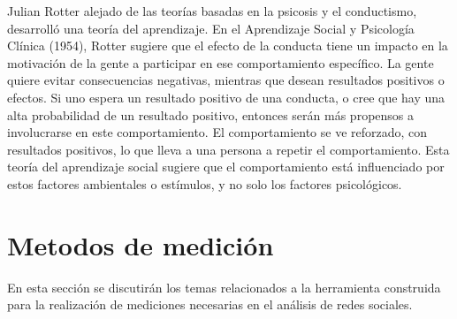 Julian Rotter alejado de las teor\'ias basadas en la psicosis y el conductismo, desarroll\'o una teor\'ia del aprendizaje.
En el Aprendizaje Social y Psicolog\'ia Cl\'inica (1954), Rotter sugiere que el efecto de la conducta tiene un impacto en la 
motivaci\'on de la gente a participar en ese comportamiento espec\'ifico. La gente quiere evitar consecuencias negativas, 
mientras que desean resultados positivos o efectos. Si uno espera un resultado positivo de una conducta, o cree que hay 
una alta probabilidad de un resultado positivo, entonces ser\'an m\'as propensos a involucrarse en este comportamiento. El 
comportamiento se ve reforzado, con resultados positivos, lo que lleva a una persona a repetir el comportamiento. Esta 
teor\'ia del aprendizaje social sugiere que el comportamiento est\'a influenciado por estos factores ambientales o est\'imulos, 
y no solo los factores psicol\'ogicos. 


\section{Metodos de medici\'on}
En esta secci\'on se discutir\'an los temas relacionados a la herramienta construida para la realizaci\'on de mediciones 
necesarias en el an\'alisis de redes sociales.

